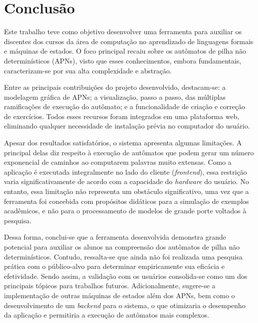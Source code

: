 \chapter[Conclusão]{Conclusão}
\label{cap:conclusao}

Este trabalho teve como objetivo desenvolver uma ferramenta para auxiliar os discentes dos cursos da área de computação no aprendizado de linguagens formais e máquinas de estados. O foco principal recaiu sobre os autômatos de pilha não determinísticos (APNs), visto que esses conhecimentos, embora fundamentais, caracterizam-se por sua alta complexidade e abstração.

Entre as principais contribuições do projeto desenvolvido, destacam-se: a modelagem gráfica de APNs; a visualização, passo a passo, das múltiplas ramificações de execução do autômato; e a funcionalidade de criação e correção de exercícios. Todos esses recursos foram integrados em uma plataforma web, eliminando qualquer necessidade de instalação prévia no computador do usuário.


Apesar dos resultados satisfatórios, o sistema apresenta algumas limitações. A principal delas diz respeito à execução de autômatos que podem gerar um número exponencial de caminhos ao computarem palavras muito extensas. Como a aplicação é executada integralmente no lado do cliente (\textit{frontend}), essa restrição varia significativamente de acordo com a capacidade do \textit{hardware} do usuário. No entanto, essa limitação não representa um obstáculo significativo, uma vez que a ferramenta foi concebida com propósitos didáticos para a simulação de exemplos acadêmicos, e não para o processamento de modelos de grande porte voltados à pesquisa.

Dessa forma, conclui-se que a ferramenta desenvolvida demonstra grande potencial para auxiliar os alunos na compreensão dos autômatos de pilha não determinísticos. Contudo, ressalta-se que ainda não foi realizada uma pesquisa prática com o público-alvo para determinar empiricamente sua eficácia e efetividade. Sendo assim, a validação com os usuários consolida-se como um dos principais tópicos para trabalhos futuros. Adicionalmente, sugere-se a implementação de outras máquinas de estados além dos APNs, bem como o desenvolvimento de um \textit{backend} para o sistema, o que otimizaria o desempenho da aplicação e permitiria a execução de autômatos mais complexos.
